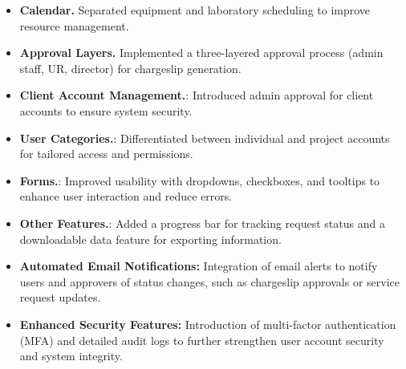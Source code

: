 \begin{itemize}
	\item \textbf{Calendar.} Separated equipment and laboratory scheduling to improve resource management.
	\item \textbf{Approval Layers.} Implemented a three-layered approval process (admin staff, UR, director) for chargeslip generation.
	\item \textbf{Client Account Management.}: Introduced admin approval for client accounts to ensure system security.
	\item \textbf{User Categories.}: Differentiated between individual and project accounts for tailored access and permissions.
	\item \textbf{Forms.}: Improved usability with dropdowns, checkboxes, and tooltips to enhance user interaction and reduce errors.
	\item \textbf{Other Features.}: Added a progress bar for tracking request status and a downloadable data feature for exporting information.
	\item \textbf{Automated Email Notifications:} Integration of email alerts to notify users and approvers of status changes, such as chargeslip approvals or service request updates.
	\item \textbf{Enhanced Security Features:} Introduction of multi-factor authentication (MFA) and detailed audit logs to further strengthen user account security and system integrity.

\end{itemize}

